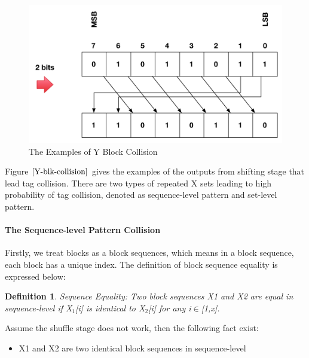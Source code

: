 \documentclass{article}
\newtheorem{defination}{Definition}[section]
\begin{document}
\begin{figure}
{\begin{minipage}[b]{0.45\textwidth}
\includegraphics[width=1\textwidth]{./diagrams/r_d_2bits.pdf}
\end{minipage}
}
 \caption{The Examples of Y Block Collision}
 \label{fig: Y-blk-collision}
\end{figure}
Figure $\ref{Y-blk-collision}$ gives the examples of the outputs from shifting
stage that lead tag collision. There are two types of repeated X sets leading to
high probability of tag collision, denoted as sequence-level pattern and
set-level pattern.
\paragraph{The Sequence-level Pattern Collision}
Firstly, we treat blocks as a block sequences, which means in a block sequence, each block has a unique index. The definition of block sequence equality is expressed below:
\begin{defination}
Sequence Equality: Two block sequences X1 and X2 are equal in sequence-level if X$_1$[i] is identical to X$_2$[i] for any i$\in$[1,x].
\end{defination}

Assume the shuffle stage does not work, then the following fact exist:
\begin{itemize}
	\item X1 and X2 are two identical block sequences in sequence-level
\end{itemize}
\end{document}
